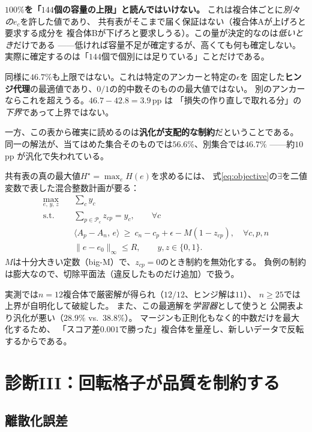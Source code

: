 \documentclass[11pt,a4paper]{article}
\begin{document}
\textbf{$100\%$を「$144$個の容量の上限」と読んではいけない。}
これは複合体ごとに\emph{別々の}$e_c$を許した値であり、
共有表がそこまで届く保証はない（複合体Aが上げろと要求する成分を
複合体Bが下げろと要求しうる）。この量が決定的なのは\emph{低いとき}だけである
——低ければ容量不足が確定するが、高くても何も確定しない。
実際に確定するのは「$144$個で個別には足りている」ことだけである。

同様に$46.7\%$も上限ではない。これは特定のアンカーと特定の$\epsilon$を
固定した\textbf{ヒンジ代理}の最適値であり、$0/1$の的中数そのものの最大値ではない。
別のアンカーならこれを超えうる。$46.7 - 42.8 = 3.9$\,pp は
「損失の作り直しで取れる分」の\emph{下界}であって上界ではない。

一方、この表から確実に読めるのは\textbf{汎化が支配的な制約}だということである。
同一の解法が、当てはめた集合そのものでは$56.6\%$、別集合では$46.7\%$
——約$10$\,pp が汎化で失われている。

共有表の真の最大値$H^\star = \max_e H(e)$を求めるには、
式\eqref{eq:objective}の$\exists$を二値変数で表した混合整数計画が要る：
\begin{align}
  \max_{e,\,y,\,z} \quad & \sum_c y_c \\
  \text{s.t.}\quad
  & \sum_{p \in \mathcal{P}_c} z_{cp} = y_c, \qquad \forall c \\
  & \langle A_p - A_n,\, e\rangle \ \ge\ c_n - c_p + \epsilon - M(1 - z_{cp}),
    \quad \forall c, p, n \\
  & \|e - e_0\|_\infty \le R, \qquad y, z \in \{0,1\} .
\end{align}
$M$は十分大きい定数（big-M）で、$z_{cp} = 0$のとき制約を無効化する。
負例の制約は膨大なので、切除平面法（違反したものだけ追加）で扱う。

実測では$n = 12$複合体で厳密解が得られ（$12/12$、ヒンジ解は$11$）、
$n \ge 25$では上界が自明化して破綻した。
また、この最適解を\emph{学習器}として使うと
公開表より汎化が悪い（$28.9\%$ vs.\ $38.8\%$）。
マージンも正則化もなく的中数だけを最大化するため、
「スコア差$0.001$で勝った」複合体を量産し、新しいデータで反転するからである。

\section{診断III：回転格子が品質を制約する}

\subsection{離散化誤差}
\end{document}

